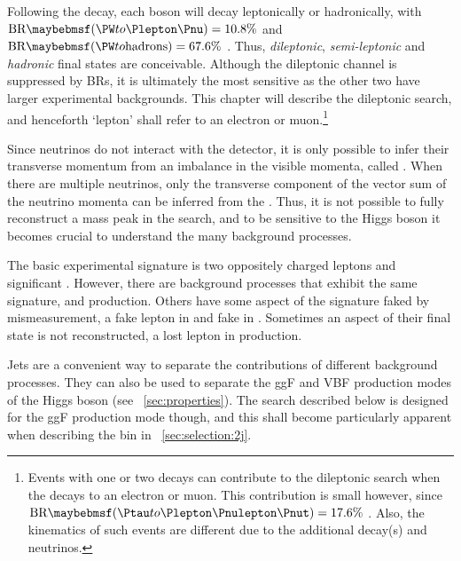 
Following the \HWW decay, each \PW boson will decay leptonically or hadronically, with 
$\text{BR}\parenths{\HepProcess{\PW\HepTo\Plepton\Pnu}} = 10.8\%$ and 
$\text{BR}\parenths{\HepProcess{\PW\HepTo \text{hadrons}}} = 67.6\%$ \cite{PDG:2012}. 
Thus, \textit{dileptonic}, \textit{semi-leptonic} and \textit{hadronic} final states are 
conceivable. Although the dileptonic channel is suppressed by \acp{BR}, it is ultimately 
the most sensitive as the other two have larger experimental backgrounds. This chapter 
will describe the dileptonic search, and henceforth 
`lepton' shall refer to an electron or muon.\footnote{
	Events with one or two \HepProcess{\PW\HepTo\Ptau\Pnu} decays can 
	contribute to the dileptonic search when the \Ptau decays to an electron or muon. This 
	contribution is small however, since
	$\text{BR}\parenths{\HepProcess{\Ptau\HepTo\Plepton\Pnulepton\Pnut}} = 17.6\%$ 
	\cite{PDG:2012}. Also, the kinematics of such events are different due to the 
	additional decay(s) and neutrinos.
}

Since neutrinos do not interact with the detector, it is only possible to infer their 
transverse momentum from an imbalance in the visible momenta, called \met. When there are 
multiple neutrinos, only the transverse component of the vector sum of the neutrino 
momenta can be inferred from the \met. Thus, it is not possible to fully reconstruct a 
mass peak in the \HWWlvlv search, and to be sensitive to the Higgs boson it becomes 
crucial to understand the many background processes.

The basic experimental signature is two oppositely charged leptons and significant \met. 
However, there are background processes that exhibit the same signature, \eg \WW and 
\ttbar production. Others have some aspect of the signature faked by mismeasurement, \eg a 
fake lepton in \Wjets and fake \met in \DYll. Sometimes an aspect of their final state is 
not reconstructed, \eg a lost lepton in \WZ production.

Jets are a convenient way to separate the contributions of different background processes. 
They can also be used to separate the \ac{ggF} and \ac{VBF} production modes of the Higgs 
boson (see \Section~\ref{sec:properties}). The search described below is designed for the 
\ac{ggF} production mode though, and this shall become particularly apparent when 
describing the \twojet bin in \Section~\ref{sec:selection:2j}.
